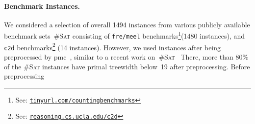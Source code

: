\documentclass{llncs}
\newcommand{\cSAT}{\textsc{\#Sat}\xspace}%
\newcommand{\WMC}{\textsc{WMC}\xspace}%
\newcommand{\instances}[1]{\texttt{#1}}
\begin{document}
\paragraph{Benchmark Instances.}
We considered a selection of overall 1494 instances from various
publicly available benchmark sets~\cSAT consisting of %
%
%
%
%
\instances{fre/meel} benchmarks\footnote{See:
  \href{http://tinyurl.com/countingbenchmarks}{\nolinkurl{tinyurl.com/countingbenchmarks}}}(1480
instances), %
and \instances{c2d} benchmarks\footnote{See:
  \href{http://reasoning.cs.ucla.edu/c2d/results.html}{\nolinkurl{reasoning.cs.ucla.edu/c2d}}}
(14 instances).
However, we used instances after being preprocessed by pmc~\cite{LagniezMarquis14},
similar to a recent work on~\cSAT~\cite{FichteHecherZisser19}
There, more than 80\% of the \cSAT instances have primal treewidth below~19
after preprocessing.
Before preprocessing
%
%
%
%
\end{document}

